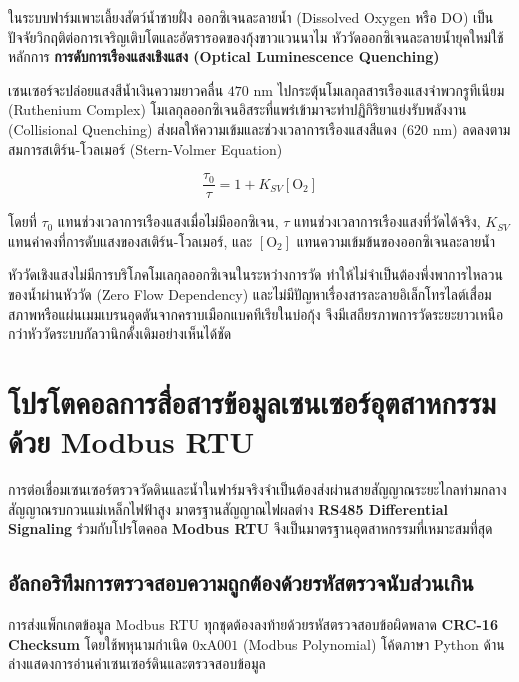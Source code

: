 ในระบบฟาร์มเพาะเลี้ยงสัตว์น้ำชายฝั่ง ออกซิเจนละลายน้ำ (Dissolved Oxygen หรือ DO) เป็นปัจจัยวิกฤติต่อการเจริญเติบโตและอัตรารอดของกุ้งขาวแวนนาไม หัววัดออกซิเจนละลายน้ำยุคใหม่ใช้หลักการ \textbf{การดับการเรืองแสงเชิงแสง (Optical Luminescence Quenching)}

เซนเซอร์จะปล่อยแสงสีน้ำเงินความยาวคลื่น $470\text{ nm}$ ไปกระตุ้นโมเลกุลสารเรืองแสงจำพวกรูทีเนียม (Ruthenium Complex) โมเลกุลออกซิเจนอิสระที่แพร่เข้ามาจะทำปฏิกิริยาแย่งรับพลังงาน (Collisional Quenching) ส่งผลให้ความเข้มและช่วงเวลาการเรืองแสงสีแดง ($620\text{ nm}$) ลดลงตามสมการสเติร์น-โวลเมอร์ (Stern-Volmer Equation)

\begin{equation}
\frac{\tau_0}{\tau} = 1 + K_{SV} [\text{O}_2]
\label{eq:stern_volmer}
\end{equation}

โดยที่ $\tau_0$ แทนช่วงเวลาการเรืองแสงเมื่อไม่มีออกซิเจน, $\tau$ แทนช่วงเวลาการเรืองแสงที่วัดได้จริง, $K_{SV}$ แทนค่าคงที่การดับแสงของสเติร์น-โวลเมอร์, และ $[\text{O}_2]$ แทนความเข้มข้นของออกซิเจนละลายน้ำ

\begin{theorybox}
หัววัดเชิงแสงไม่มีการบริโภคโมเลกุลออกซิเจนในระหว่างการวัด ทำให้ไม่จำเป็นต้องพึ่งพาการไหลวนของน้ำผ่านหัววัด (Zero Flow Dependency) และไม่มีปัญหาเรื่องสารละลายอิเล็กโทรไลต์เสื่อมสภาพหรือแผ่นเมมเบรนอุดตันจากคราบเมือกแบคทีเรียในบ่อกุ้ง จึงมีเสถียรภาพการวัดระยะยาวเหนือกว่าหัววัดระบบกัลวานิกดั้งเดิมอย่างเห็นได้ชัด
\end{theorybox}

\section{โปรโตคอลการสื่อสารข้อมูลเซนเซอร์อุตสาหกรรมด้วย Modbus RTU}

การต่อเชื่อมเซนเซอร์ตรวจวัดดินและน้ำในฟาร์มจริงจำเป็นต้องส่งผ่านสายสัญญาณระยะไกลท่ามกลางสัญญาณรบกวนแม่เหล็กไฟฟ้าสูง มาตรฐานสัญญาณไฟผลต่าง \textbf{RS485 Differential Signaling} ร่วมกับโปรโตคอล \textbf{Modbus RTU} จึงเป็นมาตรฐานอุตสาหกรรมที่เหมาะสมที่สุด

\subsection{อัลกอริทึมการตรวจสอบความถูกต้องด้วยรหัสตรวจนับส่วนเกิน}

การส่งแพ็กเกตข้อมูล Modbus RTU ทุกชุดต้องลงท้ายด้วยรหัสตรวจสอบข้อผิดพลาด \textbf{CRC-16 Checksum} โดยใช้พหุนามกำเนิด $0\text{xA001}$ (Modbus Polynomial) โค้ดภาษา Python ด้านล่างแสดงการอ่านค่าเซนเซอร์ดินและตรวจสอบข้อมูล

